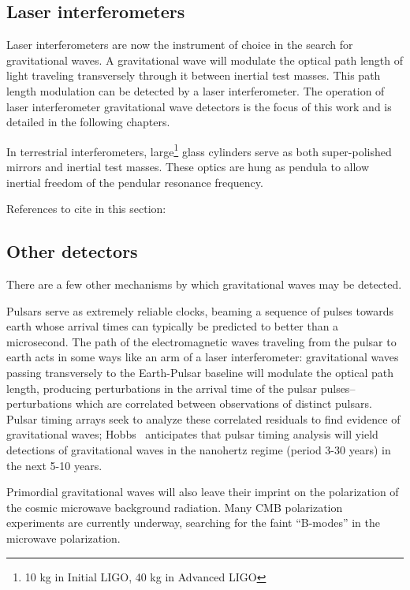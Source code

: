 \subsection{Laser interferometers}

Laser interferometers are now the instrument of choice in the search
for gravitational waves.  A gravitational wave will modulate the
optical path length of light traveling transversely through it between
inertial test masses.  This path length modulation can be detected by
a laser interferometer.  The operation of laser interferometer
gravitational wave detectors is the focus of this work and is detailed
in the following chapters.

In terrestrial interferometers, large\footnote{10 kg in Initial LIGO,
  40 kg in Advanced LIGO} glass cylinders serve as both super-polished
mirrors and inertial test masses.  These optics are hung as pendula to
allow inertial freedom of the pendular resonance frequency.

References to cite in this section: \cite{Weiss1972Electromagnetically,Forward1978Wideband,Saulson1994Fundamentals,Acernese2008Virgo}

\subsection{Other detectors}

There are a few other mechanisms by which gravitational waves may be
detected.

Pulsars serve as extremely reliable clocks, beaming a sequence of
pulses towards earth whose arrival times can typically be predicted to
better than a microsecond.  The path of the electromagnetic waves
traveling from the pulsar to earth acts in some ways like an arm of a
laser interferometer: gravitational waves passing transversely to the
Earth-Pulsar baseline will modulate the optical path length, producing
perturbations in the arrival time of the pulsar pulses--perturbations
which are correlated between observations of distinct pulsars. Pulsar
timing arrays seek to analyze these correlated residuals to find
evidence of gravitational waves;
Hobbs~\cite{Hobbs2009International} anticipates that pulsar timing
analysis will yield detections of gravitational waves in the nanohertz
regime (period 3-30 years) in the next 5-10 years.

Primordial gravitational waves will also leave their imprint on the
polarization of the cosmic microwave background radiation.  Many CMB
polarization experiments are currently underway, searching for the
faint ``B-modes'' in the microwave polarization.

